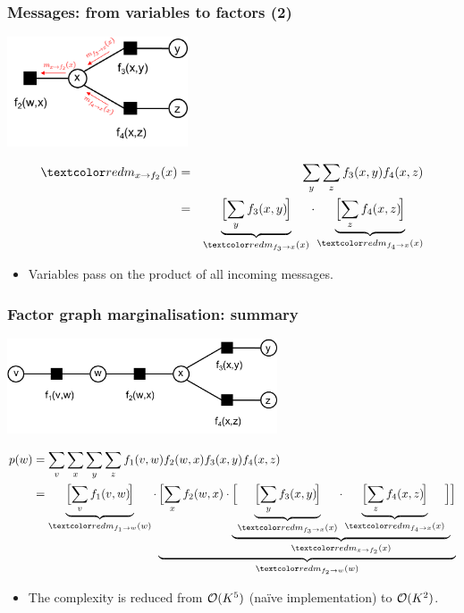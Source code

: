 \begin{frame}
\frametitle{Messages: from variables to factors (2)}

\centerline{\includegraphics[width=0.4\textwidth]{ExampleMessages4}}

\begin{eqnarray*}
\Red{m_{x\rightarrow f_2}(x)} &=& \sum_y\sum_z f_3(x,y)f_4(x,z) \\
&= &
\underbrace{\Big[\!\sum_y f_3(x,y)\!\Big]}_{\Red{m_{f_3\rightarrow x}(x)}}
\cdot
\underbrace{\Big[\!\sum_z f_4(x,z)\!\Big]}_{\Red{m_{f_4\rightarrow x}(x)}}
\end{eqnarray*}

\begin{itemize}
\item Variables pass on the product of all incoming messages.
\end{itemize}

\end{frame}


\begin{frame}
\frametitle{Factor graph marginalisation: summary}

\centerline{\includegraphics[width=0.6\textwidth]{ExampleFactorGraph1}
}
\vspace{-4mm}
\begin{align*}
p(w) &= \sum_v\sum_x\sum_y\sum_z f_1(v,w)f_2(w,x)f_3(x,y)f_4(x,z)\\
&= 
\underbrace{\Big[\!\sum_v f_1(v,w)\!\Big]}_{\Red{m_{f_1\rightarrow w}(w)}}\cdot
\underbrace{\Big[\!
\sum_x f_2(w,x) \cdot
\underbrace{\Big[\!
\underbrace{\Big[\!\sum_y f_3(x,y)\!\Big]}_{\Red{m_{f_3\rightarrow x}(x)}}
\cdot
\underbrace{\Big[\!\sum_z f_4(x,z)\!\Big]}_{\Red{m_{f_4\rightarrow x}(x)}}
\!\Big]}_{\Red{m_{x\rightarrow f_2}(x)}}
\!\Big]}_{\Red{m_{f_2\rightarrow w}(w)}}
\end{align*}
%
\vspace{-3mm}
\begin{itemize}
\item The complexity is reduced from ${\cal O}(K^5)$ (naïve implementation) to ${\cal O}(K^2)$.
\end{itemize}

\end{frame}


